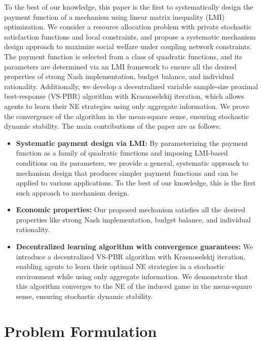 \documentclass[twocolumn]{autart}
\begin{document}
To the best of our knowledge, this paper is the first to systematically design the payment function of a mechanism using linear matrix inequality (LMI) optimization. We consider a resource allocation problem with private stochastic satisfaction functions and local constraints, and propose a systematic mechanism design approach to maximize social welfare under coupling network constraints. The payment function is selected from a class of quadratic functions, and its parameters are determined via an LMI framework to ensure all the desired properties of strong Nash implementation, budget balance, and individual rationality. Additionally, we develop a decentralized variable sample-size proximal best-response (VS-PBR) algorithm with Krasnoselskij iteration, which allows agents to learn their NE strategies using only aggregate information. We prove the convergence of the algorithm in the mean-square sense, ensuring stochastic dynamic stability. The main contributions of the paper are as follows:
\begin{itemize}
    \item 
    \textbf{Systematic payment design via LMI:} By parameterizing the payment function as a family of quadratic functions and imposing LMI-based conditions on its parameters, we provide a general, systematic approach to mechanism design that produces simpler payment functions and can be applied to various applications. To the best of our knowledge, this is the first such approach to mechanism design.
    \item 
    \textbf{Economic properties:} Our proposed mechanism satisfies all the desired properties like strong Nash implementation, budget balance, and individual rationality. 
    \item 
    \textbf{Decentralized learning algorithm with convergence guarantees:} We introduce a decentralized VS-PBR algorithm with Krasnoselskij iteration, enabling agents to learn their optimal NE strategies in a stochastic environment while using only aggregate information. We demonstrate that this algorithm converges to the NE of the induced game in the mean-square sense, ensuring stochastic dynamic stability.
\end{itemize}
\section{Problem Formulation}\label{problem_formulation_dec}
\end{document}
